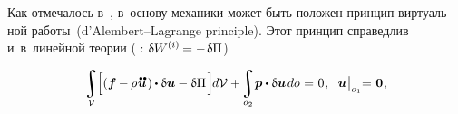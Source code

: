 \begin{otherlanguage}{russian}
Как отмечалось в~, в~основу механики может быть положен принцип виртуальной работы~(\hbox{d’\hspace{-0.2ex}Alembert--Lagrange} principle).
Этот принцип справедлив и~в~линейной теории (  : ${\variation{\internalwork} = - \hspace{.2ex} \variation{\potential}}$)

\nopagebreak\vspace{-0.2em}\begin{equation}\label{lineartheory:principleofvirtualwork}
\displaystyle\integral\displaylimits_{\mathcal{V}} \hspace{-0.2ex} \Bigl[ \left( \bm{f} \hspace{-0.1ex} - \hspace{-0.1ex} \rho \hspace{.1ex} \mathdotdotabove{\bm{u}} \hspace{.2ex} \right) \hspace{-0.1ex} \dotp \variation{\bm{u}} - \variation{\potential} \hspace{.25ex} \Bigr] \hspace{-0.2ex} d\mathcal{V}
+ \hspace{-0.3ex}
\displaystyle\integral\displaylimits_{o_2} \hspace{-0.4ex} \bm{p} \dotp \variation{\bm{u}} \hspace{.25ex} do \hspace{.1ex}
= \hspace{.1ex} 0
\hspace{.1ex} ,
\hspace{.6em}
%
\bm{u} \hspace{.1ex} \bigr|_{o_1} \hspace{-0.64ex} = \hspace{.1ex} \bm{0}
\hspace{.1ex} ,
\vspace{-0.2em}\end{equation}

\noindent\vspace{-0.2em}


\end{otherlanguage}
